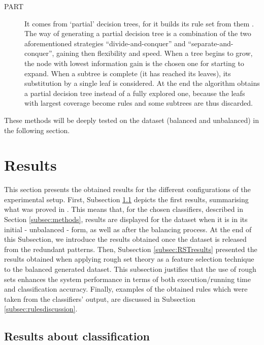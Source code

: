 \documentclass{llncs}
\begin{document}
\begin{description}
 \item[PART] It comes from `partial' decision trees, for it builds its rule set from them \cite{Frank1998}. The way of generating a partial decision tree is a combination of the two aforementioned strategies ``divide-and-conquer'' and ``separate-and-conquer'', gaining then flexibility and speed. When a tree begins to grow, the node with lowest information gain is the chosen one for starting to expand. When a subtree is complete (it has reached its leaves), its substitution by a single leaf is considered. At the end the algorithm obtains a partial decision tree instead of a fully explored one, because the leafs with largest coverage become rules and some subtrees are thus discarded.
 \end{description}

These methods will be deeply tested on the dataset (balanced and unbalanced) in the following section.

%
\section{Results}
\label{sec:results}

This section presents the obtained results for the different configurations of the experimental setup. First, Subsection \ref{subsec:firstresults} depicts the first results, summarising what was proved in \cite{ECTA}. This means that, for the chosen classifiers, described in Section \ref{subsec:methods}, results are displayed for the dataset when it is in its initial - unbalanced - form, as well as after the balancing process. At the end of this Subsection, we introduce the results obtained once the dataset is released from the redundant patterns. Then, Subsection \ref{subsec:RSTresults} presented the results obtained when applying rough set theory as a feature selection technique to the balanced generated dataset. This subsection justifies that the use of rough sets  enhances the system performance in terms of  both execution/running time and classification accuracy. Finally, examples of the obtained rules which were taken from the classifiers' output, are discussed in Subsection \ref{subsec:rulesdiscussion}.

\subsection{Results about classification}
\label{subsec:firstresults}
\end{document}
